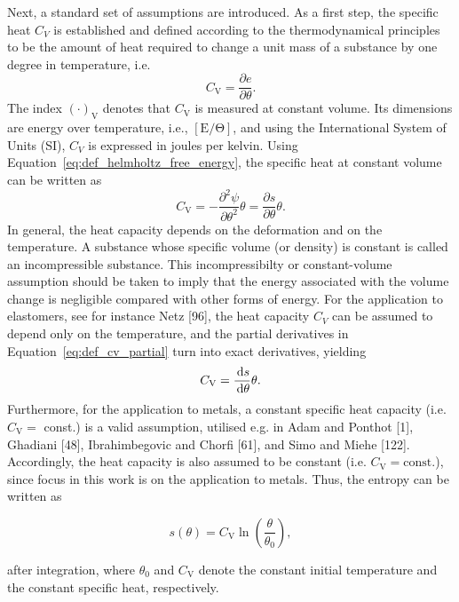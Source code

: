 Next, a standard set of assumptions are introduced.
As a first step, the specific heat \(C_{V}\) is established and defined according to the thermodynamical principles to be the amount of heat required to change a unit mass of a substance by one degree in temperature, i.e.
\begin{equation}
C_{\mathrm{V}}=\frac{\partial e}{\partial \theta}.
\end{equation}
The index \((\cdot)_\mathrm{V}\) denotes that \(C_\mathrm{V}\) is measured at constant volume.
Its dimensions are energy over temperature, i.e., \(\mathrm{[E/\Theta]}\), and using the International System of Units (SI), \(C_{V}\) is expressed in joules per kelvin.
Using Equation~\ref{eq:def_helmholtz_free_energy}, the specific heat at constant volume can be written as
\begin{equation} \label{eq:def_cv_partial}
C_{\mathrm{V}}=-\frac{\partial^{2} \psi}{\partial \theta^{2}} \theta=\frac{\partial s}{\partial \theta} \theta.
\end{equation}
In general, the heat capacity depends on the deformation and on the temperature.
A substance whose specific volume (or density) is constant is called an incompressible substance.
This incompressibilty or constant-volume assumption should be taken to imply that the energy associated with the volume change is negligible compared with other forms of energy.
For the application to elastomers, see for instance Netz [96], the heat capacity \(C_{V}\) can be assumed to depend only on the temperature, and the partial derivatives in Equation~\eqref{eq:def_cv_partial} turn into exact derivatives, yielding
\begin{equation}
  C_\mathrm{V} = \frac{\,\mathrm{d} s}{\,\mathrm{d} \theta}\theta.
\end{equation}
Furthermore, for the application to metals, a constant specific heat capacity (i.e. \(C_{\mathrm{V}}=\) const.) is a valid assumption, utilised e.g. in Adam and Ponthot [1], Ghadiani [48], Ibrahimbegovic and Chorfi [61], and Simo and Miehe [122].
Accordingly, the heat capacity is also assumed to be constant (i.e. \(C_{\mathrm{V}}= \mathrm{const}\).), since focus in this work is on the application to metals.
Thus, the entropy can be written as
\begin{highlight}
\begin{equation}
s(\theta) = C_\mathrm{V}\ln\left(\frac{\theta}{\theta_0}\right),
\end{equation}
\end{highlight}
after integration, where \(\theta_{0}\) and \(C_{\mathrm{V}}\) denote the constant initial temperature and the constant specific heat, respectively.


